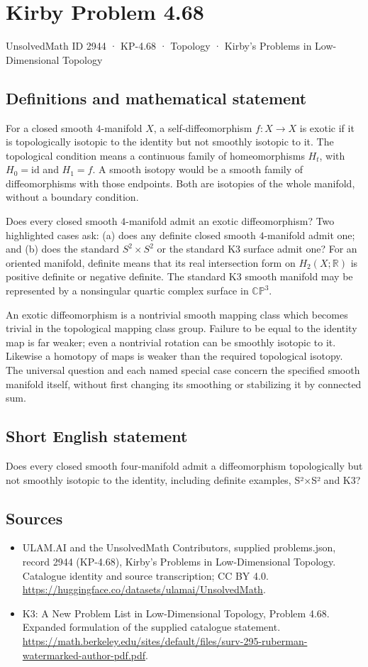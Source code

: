 \documentclass[11pt,a4paper]{article}
\begin{document}
\section*{Kirby Problem 4.68}\label{2944}
{\small UnsolvedMath ID 2944 · KP-4.68 · Topology · Kirby's Problems in Low-Dimensional Topology}
\subsection{Definitions and mathematical statement}
For a closed smooth $4$-manifold $X$, a self-diffeomorphism
$f:X\to X$ is exotic if it is topologically isotopic to the identity
but not smoothly isotopic to it. The topological condition means a
continuous family of homeomorphisms $H_t$, with $H_0=\mathrm{id}$
and $H_1=f$. A smooth isotopy would be a smooth family of
diffeomorphisms with those endpoints. Both are isotopies of the
whole manifold, without a boundary condition.

Does every closed smooth $4$-manifold admit an exotic diffeomorphism?
Two highlighted cases ask: (a) does any definite closed smooth
$4$-manifold admit one; and (b) does the standard $S^2\times S^2$
or the standard K3 surface admit one?
For an oriented manifold, definite means that its real intersection
form on $H_2(X;\mathbb R)$ is positive definite or negative definite.
The standard K3 smooth manifold may be represented by a nonsingular
quartic complex surface in $\mathbb{CP}^3$.

An exotic diffeomorphism is a nontrivial smooth mapping class which
becomes trivial in the topological mapping class group. Failure to
be equal to the identity map is far weaker; even a nontrivial
rotation can be smoothly isotopic to it. Likewise a homotopy of maps
is weaker than the required topological isotopy.
The universal question and each named special case concern the
specified smooth manifold itself, without first changing its smoothing
or stabilizing it by connected sum.
\subsection{Short English statement}
Does every closed smooth four-manifold admit a diffeomorphism topologically but not smoothly isotopic to the identity, including definite examples, S²×S² and K3?
\subsection{Sources}
\begin{itemize}
\item[S1] ULAM.AI and the UnsolvedMath Contributors, supplied problems.json, record 2944 (KP-4.68), Kirby's Problems in Low-Dimensional Topology. Catalogue identity and source transcription; CC BY 4.0.
\url{https://huggingface.co/datasets/ulamai/UnsolvedMath}.
\item[S2] K3: A New Problem List in Low-Dimensional Topology, Problem 4.68. Expanded formulation of the supplied catalogue statement.
\url{https://math.berkeley.edu/sites/default/files/surv-295-ruberman-watermarked-author-pdf.pdf}.
\end{itemize}
\end{document}
